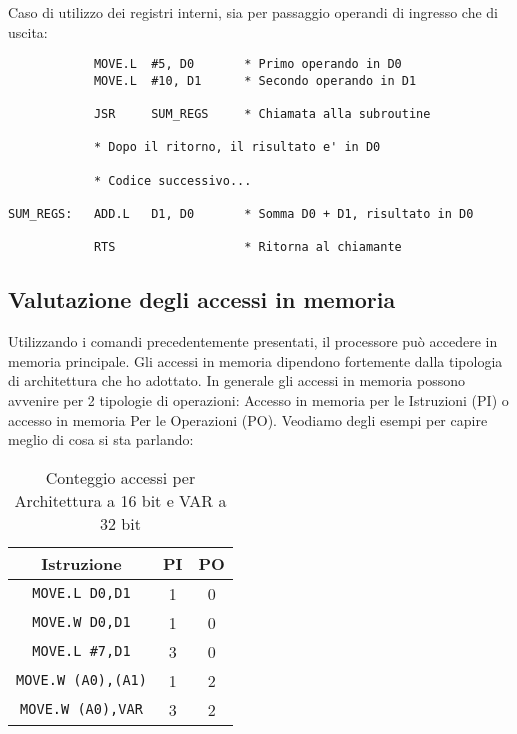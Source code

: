 Caso di utilizzo dei registri interni, sia per passaggio operandi di ingresso che di uscita:

\begin{lstlisting}
            MOVE.L  #5, D0       * Primo operando in D0
            MOVE.L  #10, D1      * Secondo operando in D1

            JSR     SUM_REGS     * Chiamata alla subroutine

            * Dopo il ritorno, il risultato e' in D0

            * Codice successivo...

SUM_REGS:   ADD.L   D1, D0       * Somma D0 + D1, risultato in D0

            RTS                  * Ritorna al chiamante

\end{lstlisting}

\subsection{Valutazione degli accessi in memoria}
Utilizzando i comandi precedentemente presentati, il processore può accedere in memoria principale. Gli accessi in memoria dipendono fortemente dalla tipologia di architettura che ho adottato. In generale gli accessi in memoria possono avvenire per 2 tipologie di operazioni: Accesso in memoria per le Istruzioni (PI) o accesso in memoria Per le Operazioni (PO).
Veodiamo degli esempi per capire meglio di cosa si sta parlando:
\begin{table}[h]
    \centering
    \begin{tabular}{|c|c|c|}
        \hline
        \textbf{Istruzione} & \textbf{PI} & \textbf{PO} \\
        \hline
        \lstinline|MOVE.L D0,D1| & 1 & 0 \\
        \lstinline|MOVE.W D0,D1| & 1 & 0 \\
        \lstinline|MOVE.L #7,D1| & 3 & 0 \\
        \lstinline|MOVE.W (A0),(A1)| & 1 & 2 \\
        \lstinline|MOVE.W (A0),VAR| & 3 & 2 \\
        \hline
    \end{tabular}
    \caption{Conteggio accessi per Architettura a 16 bit e VAR a 32 bit}
    \label{tab:esempio}
\end{table}

